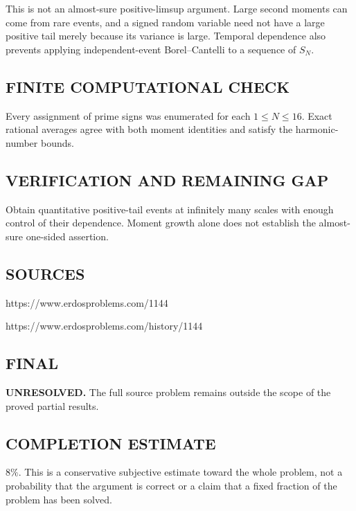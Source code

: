 This is not an almost-sure positive-limsup argument. Large second moments can
come from rare events, and a signed random variable need not have a large
positive tail merely because its variance is large. Temporal dependence also
prevents applying independent-event Borel--Cantelli to a sequence of $S_N$.

\subsection*{FINITE COMPUTATIONAL CHECK}
Every assignment of prime signs was enumerated for each $1\le N\le16$. Exact rational averages agree with both moment identities and satisfy the harmonic-number bounds.

\subsection*{VERIFICATION AND REMAINING GAP}
Obtain quantitative positive-tail events at infinitely many scales with
enough control of their dependence. Moment growth alone does not establish
the almost-sure one-sided assertion.

\subsection*{SOURCES}
https://www.erdosproblems.com/1144

https://www.erdosproblems.com/history/1144

\subsection*{FINAL}
\textbf{UNRESOLVED.} The full source problem remains outside the scope of the proved partial results.

\subsection*{COMPLETION ESTIMATE}
$8\%$. This is a conservative subjective estimate toward the whole problem, not a probability that the argument is correct or a claim that a fixed fraction of the problem has been solved.

